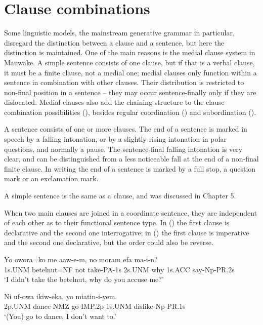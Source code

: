 
\chapter{Clause combinations}
\hypertarget{RefHeading22901935131865}{}
Some linguistic models, the mainstream generative grammar in particular, disregard the distinction between a clause and a sentence, but here the distinction is maintained. One of the main reasons is the medial clause system in Mauwake.  A simple sentence consists of one clause, but if that is a verbal clause, it must be a finite clause, not a medial one; medial clauses only function within a sentence in combination with other clauses. Their distribution is restricted to non-final position in a sentence -- they may occur sentence-finally only if they are dislocated. Medial clauses also add the chaining structure to the clause combination possibilities (), besides regular coordination () and subordination (). 

A sentence consists of one or more clauses. The end of a sentence is marked in speech by a falling intonation, or by a slightly rising intonation in polar questions, and normally a pause. The sentence-final falling intonation is very clear, and can be distinguished from a less noticeable fall at the end of a non-final finite clause. In writing the end of a sentence is marked by a full stop, a question mark or an exclamation mark.

A simple sentence is the same as a clause, and was discussed in Chapter 5.

When two main clauses are joined in a coordinate sentence, they are independent of each other as to their functional sentence type. In () the first clause is declarative and the second one interrogative; in () the first clause is imperative and the second one declarative, but the order could also be reverse. 

\ea%
\label{ex:x1352}
\gll Yo  owora=ko  me  aaw-e-m,  no  moram  efa ma-i-n?\\
1s.UNM  betelnut=NF  not  take-PA-1s  2s.UNM  why  1s.ACC say-Np-PR.2s\\
\glt `I didn't take the betelnut, why do you accuse me?'
\z


\ea%
\label{ex:x1358}
\gll Ni  uf-owa  ikiw-eka,  yo  miatin-i-yem. \\
2p.UNM  dance-NMZ  go-IMP.2p  1s.UNM  dislike-Np-PR.1s\\
\glt `(You) go to dance, I don't want to.'
\z

